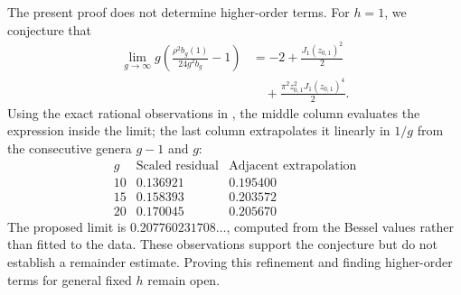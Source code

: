 \begin{samepage}
\begin{rmk}\label{rmk:s08:further-asymptotics}
The present proof does not determine higher-order terms.
For $h=1$, we conjecture that
\[
 \begin{aligned}
 \lim_{g\to\infty}
 g\left(\frac{\rho^2b_g(1)}{24g^2b_g}-1\right)
 &=-2+\frac{J_1(z_{0,1})^2}{2}\\
 &\quad+\frac{\pi^2z_{0,1}^2J_1(z_{0,1})^4}{2}.
 \end{aligned}
\]
Using the exact rational observations in \cite{LiuData26}, the
middle column evaluates the expression inside the limit; the
last column extrapolates it linearly in $1/g$ from the consecutive
genera $g-1$ and $g$:
\[
 \begin{array}{c|cc}
 g&\text{Scaled residual}&\text{Adjacent extrapolation}\\ \hline
 10&0.136921&0.195400\\
 15&0.158393&0.203572\\
 20&0.170045&0.205670
 \end{array}
\]
The proposed limit is
$0.207760231708\ldots$, computed from the Bessel values rather
than fitted to the data. These observations support the conjecture
but do not establish a remainder estimate. Proving this refinement
and finding higher-order terms for general fixed $h$ remain open.
\end{rmk}
\end{samepage}

